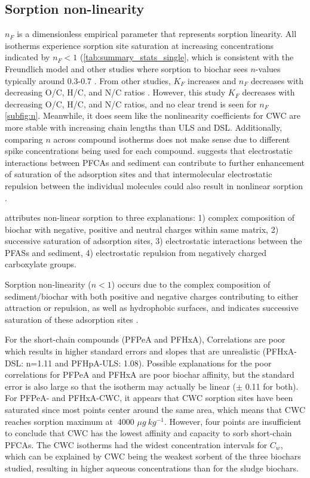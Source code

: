 \subsection{Sorption non-linearity}
$n_F$ is a dimensionless empirical parameter that represents sorption linearity. All isotherms experience sorption site saturation at increasing concentrations indicated by $n_F<1 $ (\cref{tab:summary_stats_single}, which is consistent with the Freundlich model and other studies where sorption to biochar sees $n$-values typically around 0.3-0.7 \citep{Cornelissen2005}. From other studies, $K_F$ increases and $n_F$ decreases with decreasing O/C, H/C, and N/C ratios \citep{Cornelissen2005}. However, this study $K_F$ decreases with decreasing O/C, H/C, and N/C ratios, and no clear trend is seen for $n_F$ \cref{subfig:n}. Meanwhile, it does seem like the nonlinearity coefficients for CWC are more stable with increasing chain lengths than ULS and DSL. Additionally, comparing $n$ across compound isotherms does not make sense due to different spike concentrations being used for each compound. \citep{yin2022insights} suggests that electrostatic interactions between PFCAs and sediment can contribute to further enhancement of saturation of the adsorption sites and that intermolecular electrostatic repulsion between the individual molecules could also result in nonlinear sorption \citep{higgins2006sorption,yin2022insights}.

\citep{yin2022insights} attributes non-linear sorption to three explanations: 1) complex composition of biochar with negative, positive and neutral charges within same matrix, 2) successive saturation of adsorption sites, 3) electrostatic interactions between the PFASs and sediment, 4) electrostatic repulsion from negatively charged carboxylate groups. 

Sorption non-linearity ($n<1$) occurs due to the complex composition of sediment/biochar with both positive and negative charges contributing to either attraction or repulsion, as well as hydrophobic surfaces, and indicates successive saturation of these adsorption sites \citep{yin2022insights}.  

For the short-chain compounds (PFPeA and PFHxA), Correlations are poor which results in higher standard errors and slopes that are unrealistic (PFHxA-DSL: n=1.11 and PFHpA-ULS: 1.08). Possible explanations for the poor correlations for PFPeA and PFHxA are poor biochar affinity, but the standard error is also large so that the isotherm may actually be linear ($\pm$ 0.11 for both). For PFPeA- and PFHxA-CWC, it appears that CWC sorption sites have been saturated since most points center around the same area, which means that CWC reaches sorption maximum at $~$4000 $\mu g~kg^{-1}$. However, four points are insufficient to conclude that CWC has the lowest affinity and capacity to sorb short-chain PFCAs. The CWC isotherms had the widest concentration intervals for $C_w$, which can be explained by CWC being the weakest sorbent of the three biochars studied, resulting in higher aqueous concentrations than for the sludge biochars. 

